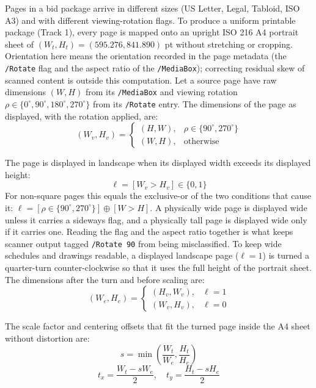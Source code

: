 Pages in a bid package arrive in different sizes (US Letter, Legal, Tabloid, ISO A3) and with different viewing-rotation flags. To produce a uniform printable package (Track 1), every page is mapped onto an upright ISO 216 A4 portrait sheet of $(W_t, H_t) = (595.276, 841.890)$ pt without stretching or cropping. Orientation here means the orientation recorded in the page metadata (the \texttt{/Rotate} flag and the aspect ratio of the \texttt{/MediaBox}); correcting residual skew of scanned content is outside this computation.
Let a source page have raw dimensions $(W, H)$ from its \texttt{/MediaBox} and viewing rotation $\rho \in \{0^\circ, 90^\circ, 180^\circ, 270^\circ\}$ from its \texttt{/Rotate} entry.
The dimensions of the page as displayed, with the rotation applied, are:
\begin{equation}
\label{eq:disp_dim}
(W_v, H_v) = \begin{cases} (H, W), & \rho \in \{90^\circ, 270^\circ\} \\ (W, H), & \text{otherwise} \end{cases}
\end{equation}

The page is displayed in landscape when its displayed width exceeds its displayed height:
\begin{equation}
\label{eq:landscape_indicator}
\ell = [W_v > H_v] \in \{0, 1\}
\end{equation}
For non-square pages this equals the exclusive-or of the two conditions that cause it: $\ell = [\rho \in \{90^\circ, 270^\circ\}] \oplus [W > H]$. A physically wide page is displayed wide unless it carries a sideways flag, and a physically tall page is displayed wide only if it carries one. Reading the flag and the aspect ratio together is what keeps scanner output tagged \texttt{/Rotate 90} from being misclassified.
To keep wide schedules and drawings readable, a displayed landscape page ($\ell = 1$) is turned a quarter-turn counter-clockwise so that it uses the full height of the portrait sheet.
The dimensions after the turn and before scaling are:
\begin{equation}
\label{eq:turned_dim}
(W_e, H_e) = \begin{cases} (H_v, W_v), & \ell = 1 \\ (W_v, H_v), & \ell = 0 \end{cases}
\end{equation}

The scale factor and centering offsets that fit the turned page inside the A4 sheet without distortion are:
\begin{equation}
\label{eq:scaling_factor}
s = \min\left( \frac{W_t}{W_e}, \frac{H_t}{H_e} \right)
\end{equation}
\begin{equation}
\label{eq:translation_offsets}
t_x = \frac{W_t - s W_e}{2}, \quad t_y = \frac{H_t - s H_e}{2}
\end{equation}

